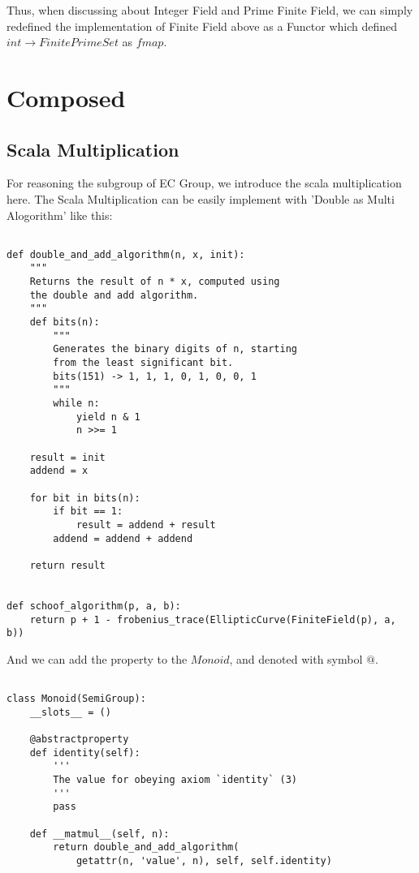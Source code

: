 \documentclass{article}
\begin{document}
Thus, when discussing about Integer Field and Prime Finite Field, we can simply redefined the implementation of Finite Field above as a Functor which defined $int \rightarrow Finite Prime Set$ as $fmap$.

\section{Composed}
\subsection{Scala Multiplication}

For reasoning the subgroup of EC Group, we introduce the scala multiplication here. The Scala Multiplication can be easily implement with 'Double as Multi Alogorithm' like this:

\begin{lstlisting}
  
def double_and_add_algorithm(n, x, init):
    """
    Returns the result of n * x, computed using
    the double and add algorithm.
    """
    def bits(n):
        """
        Generates the binary digits of n, starting
        from the least significant bit.
        bits(151) -> 1, 1, 1, 0, 1, 0, 0, 1
        """
        while n:
            yield n & 1
            n >>= 1

    result = init
    addend = x

    for bit in bits(n):
        if bit == 1:
            result = addend + result
        addend = addend + addend

    return result


def schoof_algorithm(p, a, b):
    return p + 1 - frobenius_trace(EllipticCurve(FiniteField(p), a, b))

  \end{lstlisting}

  And we can add the property to the $Monoid$, and denoted with symbol $@$.
 \begin{lstlisting}

class Monoid(SemiGroup):
    __slots__ = ()

    @abstractproperty
    def identity(self):
        '''
        The value for obeying axiom `identity` (3)
        '''
        pass

    def __matmul__(self, n):
        return double_and_add_algorithm(
            getattr(n, 'value', n), self, self.identity)


  \end{lstlisting}
 
\end{document}
